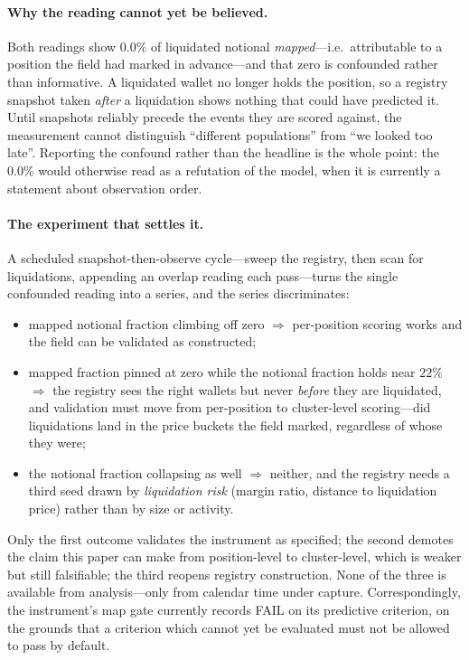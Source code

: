 \documentclass[11pt,a4paper]{article}
\theoremstyle{definition}
\theoremstyle{plain}
\begin{document}
\paragraph{Why the reading cannot yet be believed.} Both readings show $0.0\%$ of liquidated
notional \emph{mapped}---i.e.\ attributable to a position the field had marked in advance---and that
zero is confounded rather than informative. A liquidated wallet no longer holds the position, so a
registry snapshot taken \emph{after} a liquidation shows nothing that could have predicted it. Until
snapshots reliably precede the events they are scored against, the measurement cannot distinguish
``different populations'' from ``we looked too late''. Reporting the confound rather than the
headline is the whole point: the $0.0\%$ would otherwise read as a refutation of the model, when it
is currently a statement about observation order.

\paragraph{The experiment that settles it.} A scheduled snapshot-then-observe cycle---sweep the
registry, then scan for liquidations, appending an overlap reading each pass---turns the single
confounded reading into a series, and the series discriminates:

\begin{itemize}
  \item mapped notional fraction climbing off zero $\Rightarrow$ per-position scoring works and the
        field can be validated as constructed;
  \item mapped fraction pinned at zero while the notional fraction holds near $22\%$ $\Rightarrow$
        the registry sees the right wallets but never \emph{before} they are liquidated, and
        validation must move from per-position to cluster-level scoring---did liquidations land in
        the price buckets the field marked, regardless of whose they were;
  \item the notional fraction collapsing as well $\Rightarrow$ neither, and the registry needs a
        third seed drawn by \emph{liquidation risk} (margin ratio, distance to liquidation price)
        rather than by size or activity.
\end{itemize}

Only the first outcome validates the instrument as specified; the second demotes the claim this
paper can make from position-level to cluster-level, which is weaker but still falsifiable; the
third reopens registry construction. None of the three is available from analysis---only from
calendar time under capture. Correspondingly, the instrument's map gate currently records
\textsf{FAIL} on its predictive criterion, on the grounds that a criterion which cannot yet be
evaluated must not be allowed to pass by default.
\end{document}
